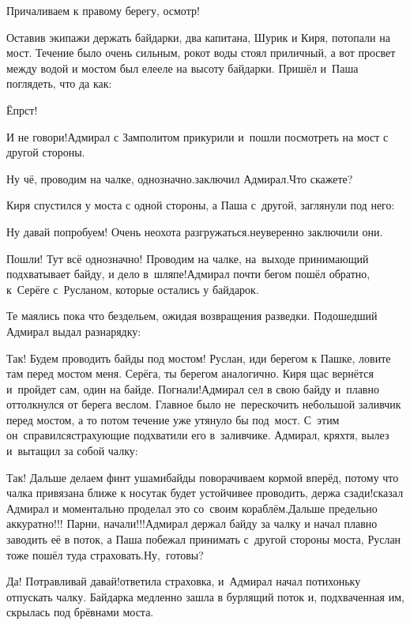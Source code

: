\diagdash Причаливаем к правому берегу, осмотр!

Оставив экипажи держать байдарки, два капитана, Шурик и Киря, потопали на мост. Течение было очень сильным, рокот воды стоял приличный, а вот просвет между водой и мостом был еле\sdash еле на высоту байдарки. Пришёл и~Паша поглядеть, что да как:

\diagdash Ёпрст!

\diagdash И не говори!\mdash Адмирал с Замполитом прикурили и~пошли посмотреть на мост с другой стороны.

\diagdash Ну чё, проводим на чалке, однозначно.\mdash заключил Адмирал.\mdash Что скажете?

Киря спустился у моста с одной стороны, а Паша с~другой, заглянули под него:

\diagdash Ну давай попробуем! Очень неохота разгружаться.\mdash неуверенно заключили они.

\diagdash Пошли! Тут всё однозначно! Проводим на чалке, на~выходе принимающий подхватывает байду, и дело в~шляпе!\mdash Адмирал почти бегом пошёл обратно, к~Серёге с~Русланом, которые остались у байдарок.

Те маялись пока что бездельем, ожидая возвращения разведки. Подошедший Адмирал выдал разнарядку:

\diagdash Так! Будем проводить байды под мостом! Руслан, иди берегом к Пашке, ловите там перед мостом меня. Серёга, ты берегом аналогично. Киря щас вернётся и~пройдет сам, один на байде. Погнали!\mdash Адмирал сел в свою байду и~плавно оттолкнулся от берега веслом. Главное было не~перескочить небольшой заливчик перед мостом, а то потом течение уже утянуло бы под~мост. С~этим он~справился\mdash страхующие подхватили его в~заливчике. Адмирал, кряхтя, вылез и~вытащил за собой чалку:

\diagdash Так! Дальше делаем финт ушами\mdash байды поворачиваем кормой вперёд, потому что чалка привязана ближе к носу\mdash так будет устойчивее проводить, держа сзади!\mdash сказал Адмирал и моментально проделал это со~своим кораблём.\mdash Дальше предельно аккуратно!!! Парни, начали!!!\mdash Адмирал держал байду за чалку и начал плавно заводить её в поток, а Паша побежал принимать с~другой стороны моста, Руслан тоже пошёл туда страховать.\mdash Ну,~готовы?

\diagdash Да! Потравливай давай!\mdash ответила страховка, и~Адмирал начал потихоньку отпускать чалку. Байдарка медленно зашла в бурлящий поток и, подхваченная им, скрылась под брёвнами моста.


